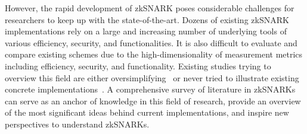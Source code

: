 \documentclass[acmlarge]{acmart}
\theoremstyle{plain}
\theoremstyle{definition}
\theoremstyle{remark}
\begin{document}
However, the rapid development of zkSNARK poses considerable challenges for researchers to keep up with the state-of-the-art.
Dozens of existing zkSNARK implementations rely on a large and increasing number of underlying tools of various efficiency, security, and functionalities.
It is also difficult to evaluate and compare existing schemes due to the high-dimensionality of measurement metrics including efficiency, security, and functionality.
Existing studies trying to overview this field are either oversimplifying~\cite{Nitulescu19, WalfishB15} or never tried to illustrate existing concrete implementations~\cite{ZKProof20}.
A comprehensive survey of literature in zkSNARKs can serve as an anchor of knowledge in this field of research, provide an overview of the most significant ideas behind current implementations, and inspire new perspectives to understand zkSNARKs.

\end{document}
